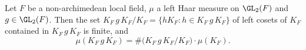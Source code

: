 Let $F$ be a non-archimedean local field, $\mu$ a left Haar measure on $\GL_2(F)$ and $g\in\GL_2(F)$. Then the set
$K_F\,g\,K_F/K_F=\{hK_F:h\in K_F\,g\,K_F\}$ of left cosets of $K_F$ contained in $K_F\,g\,K_F$ is finite, and
\[
  \mu(K_F\,g\,K_F)=\#\bigl(K_F\,g\,K_F/K_F\bigr)\cdot\mu(K_F).
\]
